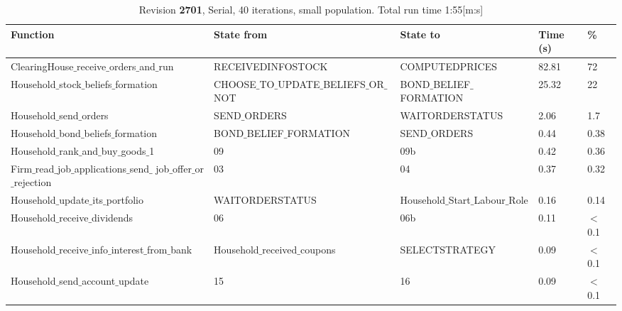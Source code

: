\begin{landscape}
\begin{table}
\begin{tabular}{|l|l|l|l|l|}\hline
Function & State from & State to & Time (s) & \% \\ \hline
ClearingHouse$\_$receive$\_$orders$\_$and$\_$run & RECEIVEDINFOSTOCK & COMPUTEDPRICES &  82.81 & 72 \\ \hline
Household$\_$stock$\_$beliefs$\_$formation & CHOOSE$\_$TO$\_$UPDATE$\_$BELIEFS$\_$OR$\_$NOT & BOND$\_$BELIEF$\_$FORMATION &  25.32 & 22 \\ \hline
Household$\_$send$\_$orders & SEND$\_$ORDERS & WAITORDERSTATUS &  2.06 & 1.7 \\ \hline
Household$\_$bond$\_$beliefs$\_$formation & BOND$\_$BELIEF$\_$FORMATION &SEND$\_$ORDERS &  0.44 & 0.38 \\ \hline
Household$\_$rank$\_$and$\_$buy$\_$goods$\_$1 & 09 & 09b &  0.42 & 0.36 \\ \hline
\parbox[t]{6cm}{Firm$\_$read$\_$job$\_$applications$\_$send$\_$\\[-4pt]job$\_$offer$\_$or$\_$rejection} & 03 & 04 &  0.37 & 0.32 \\ \hline
Household$\_$update$\_$its$\_$portfolio & WAITORDERSTATUS & Household$\_$Start$\_$Labour$\_$Role &  0.16 & 0.14 \\ \hline
Household$\_$receive$\_$dividends & 06 & 06b &  0.11 & $<$0.1 \\ \hline
Household$\_$receive$\_$info$\_$interest$\_$from$\_$bank & Household$\_$received$\_$coupons & SELECTSTRATEGY &  0.09 & $<$0.1 \\ \hline
Household$\_$send$\_$account$\_$update & 15 & 16 &  0.09 & $<$0.1 \\ \hline
\end{tabular}
\caption{Revision \textbf{2701}, Serial, 40 iterations, small population. Total run time 1:55[m:s]\label{table:r2701}}
\end{table}


\end{landscape}
